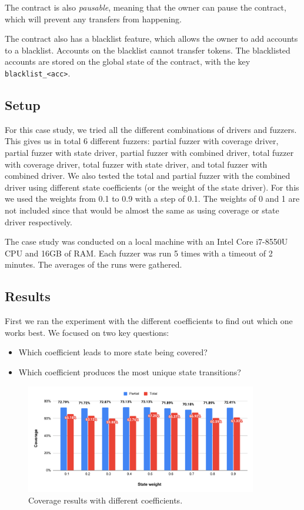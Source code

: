 The contract is also \emph{pausable}, meaning that the owner can pause the contract, which will prevent any transfers from happening.

The contract also has a blacklist feature, which allows the owner to add accounts to a blacklist.
Accounts on the blacklist cannot transfer tokens.
The blacklisted accounts are stored on the global state of the contract, with the key \texttt{blacklist\_<acc>}.

\subsection*{Setup}
For this case study, we tried all the different combinations of drivers and fuzzers.
This gives us in total 6 different fuzzers: partial fuzzer with coverage driver, partial fuzzer with state driver, partial fuzzer with combined driver, total fuzzer with coverage driver, total fuzzer with state driver, and total fuzzer with combined driver.
We also tested the total and partial fuzzer with the combined driver using different state coefficients (or the weight of the state driver).
For this we used the weights from 0.1 to 0.9 with a step of 0.1.
The weights of 0 and 1 are not included since that would be almost the same as using coverage or state driver respectively.

The case study was conducted on a local machine with an Intel Core i7-8550U CPU and 16GB of RAM.
Each fuzzer was run 5 times with a timeout of 2 minutes.
The averages of the runs were gathered.

\subsection*{Results}
First we ran the experiment with the different coefficients to find out which one works best. We focused on two key questions:
\begin{itemize}
    \item Which coefficient leads to more state being covered?
    \item Which coefficient produces the most unique state transitions?
\end{itemize}

\begin{figure}[htbp]
    \centering
    \includegraphics[width=0.9\textwidth]{charts/coef-cov-2.pdf}
    \caption{Coverage results with different coefficients.}\label{fig:case-study-coeff}
\end{figure}

